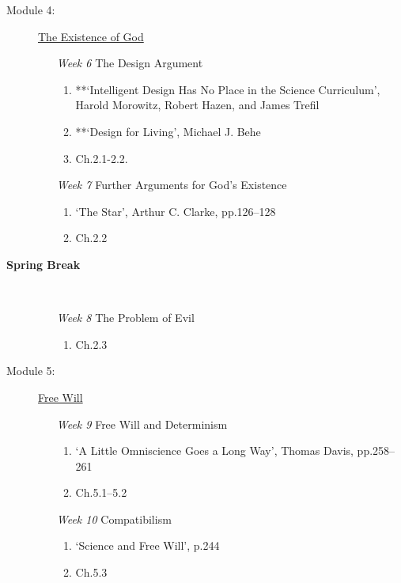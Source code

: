 \documentclass[article,oneside]{memoir}
\begin{document}
\begin{description}
\item[Module 4: ] \href{http://scoconno.github.io/Teaching/Examined/God/}{The Existence of God}

\begin{enumerate}

\item[\textit{Week 6}] The Design Argument
\begin{enumerate}
\item **`Intelligent Design Has No Place in the Science Curriculum', Harold Morowitz, Robert Hazen, and James Trefil
 \item **`Design for Living', Michael J. Behe
\item Ch.2.1-2.2. 

 \end{enumerate}
 
\item[\textit{Week 7}] Further Arguments for God's Existence
\begin{enumerate}
\item `The Star', Arthur C. Clarke, pp.126--128
\item Ch.2.2
\end{enumerate}
\end{enumerate}
\item[\textbf{Spring Break}]\

\begin{enumerate}
\item[\textit{Week 8}] The Problem of Evil 
\begin{enumerate}
\item Ch.2.3
\end{enumerate}
\end{enumerate}


\item[Module 5:] \href{http://scoconno.github.io/Teaching/Examined/FreeWill/}{Free Will}

\begin{enumerate}

\item[\textit{Week 9}] Free Will and Determinism
\begin{enumerate}
\item `A Little Omniscience Goes a Long Way', Thomas Davis, pp.258--261
\item Ch.5.1--5.2
\end{enumerate}

\item[\textit{Week 10}] Compatibilism
\begin{enumerate}
\item `Science and Free Will', p.244
\item Ch.5.3
\end{enumerate}
\end{enumerate}


\end{description}
\end{document}
